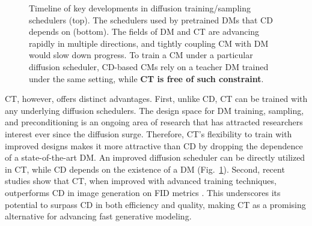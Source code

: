 \begin{figure}[t!]
\begin{tikzpicture}[scale=0.7, transform shape]


    \end{tikzpicture}
    \vspace{-1em}
    \caption{Timeline of key developments in diffusion training/sampling schedulers (top). The schedulers used by pretrained DMs that CD depends on (bottom). The fields of DM and CT are advancing rapidly in multiple directions, and tightly coupling CM with DM would slow down progress. To train a CM under a particular diffusion scheduler, CD-based CMs rely on a teacher DM trained under the same setting, while \textbf{CT is free of such constraint}.} 
    \vspace{-1.5em}
    \label{fig:dm&cd}
\end{figure}


CT, however, offers distinct advantages. First, unlike CD, CT can be trained with any underlying diffusion schedulers. The design space for DM training, sampling, and preconditioning \cite{karras2022elucidating} is an ongoing area of research that has attracted researchers interest ever since the diffusion surge. Therefore, CT's flexibility to train with improved designs makes it more attractive than CD by dropping the dependence of a state-of-the-art DM. An improved diffusion scheduler can be directly utilized in CT, while CD depends on the existence of a DM (Fig.~\ref{fig:dm&cd}). Second, recent studies show that CT, when improved with advanced training techniques, outperforms CD in image generation on FID metrics \cite{song2023improved,ect}. This underscores its potential to surpass CD in both efficiency and quality, making CT as a promising alternative for advancing fast generative modeling. 

